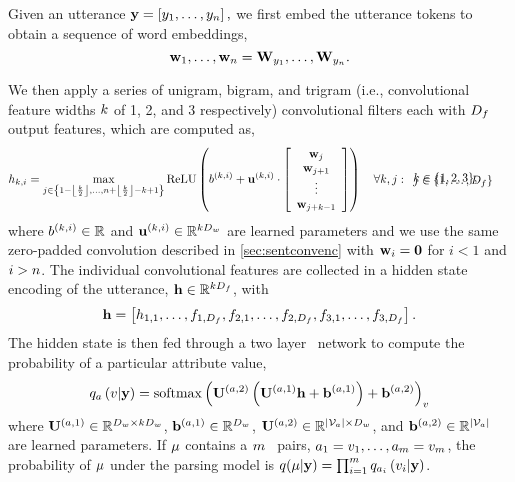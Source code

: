Given an utterance $\mathbf{y} = \left[y_1,\ldots,y_n\right],$
we first embed the utterance tokens to obtain a sequence of 
word embeddings, \[  \mathbf{w}_1, \ldots, \mathbf{w}_n = \mathbf{W}_{y_1}, \ldots, \mathbf{W}_{y_n}. \]

We then apply a series of unigram, bigram, and trigram (i.e., convolutional feature widths ${k}$ of 1, 2, and 3 respectively)  convolutional
filters each with $D_f$ output features, which are computed as,
\begin{align*} {h}_{k,i} & = 
    \max_{j \in \left\{ 1 - \left\lfloor \frac{{k}}{2} \right\rfloor, \ldots, n + \left\lfloor \frac{{k}}{2} \right\rfloor - {k} + 1 \right\} } 
    \operatorname{ReLU}\left({b^{(k,i)}} + {\mathbf{u}^{(k,i)}} \cdot
\left[\begin{array}{c} \mathbf{w}_j \\ \mathbf{w}_{j+1}\\\vdots \\\mathbf{w}_{j+k-1} \end{array}  \right]\right)  \quad \forall k,j: \begin{array}{l} k \in \{1,2,3\}, \\[-1em] j \in \{1,\ldots, D_f\} \end{array}
\end{align*}
where ${b^{(k,i)}} \in \mathbb{R}$ and ${\mathbf{u}^{(k,i)}} \in \mathbb{R}^{{k}D_w}$ are learned parameters and we use the same zero-padded
convolution described in \autoref{sec:sentconvenc} with $\mathbf{w}_i = \mathbf{0}$
for $i < 1$ and $i > n$.
The individual convolutional features are collected in a hidden
state encoding of the utterance, $\mathbf{h} \in \mathbb{R}^{{k} D_f}$,
with
\[
\mathbf{h} = \left[{h}_{1,1},\ldots,f_{1,D_f},f_{2,1},\ldots,f_{2,D_f}, f_{3,1}, \ldots, f_{3,D_f}\right].
\] 
The hidden state is then fed through a two layer \feedforward~network 
to compute the probability of a particular attribute value,
\[    
q_{a}\left(v|\mathbf{y}\right)   = \operatorname*{softmax}\left({\mathbf{U}^{(a,2)}} \left( {\mathbf{U}^{(a,1)}} \mathbf{h} + {\mathbf{b}^{(a,1)}}\right)   + {\mathbf{b}^{(a,2)}} \right)_{v}
\]
where ${\mathbf{U}^{(a,1)}} \in \mathbb{R}^{D_w \times {k}D_w}$, ${\mathbf{b}^{(a,1)}} \in \mathbb{R}^{D_w}$, ${\mathbf{U}^{(a,2)}} \in \mathbb{R}^{{\left\vert {\mathcal{V}_{\ensuremath{a}}} \right\vert} \times D_w}$, and ${\mathbf{b}^{(a,2)}} \in \mathbb{R}^{{\left\vert {\mathcal{V}_{\ensuremath{a}}} \right\vert}}$ are learned parameters. If $\mu$ contains a $m$
\attributevalue~pairs, $a_1=v_1,\ldots,a_{m}=v_{m}$,
the probability of $\mu$ under the parsing model is $q(\mu|\mathbf{y}) = \prod_{i=1}^{m} q_{a_i}\left(v_i|\mathbf{y} \right)$.

